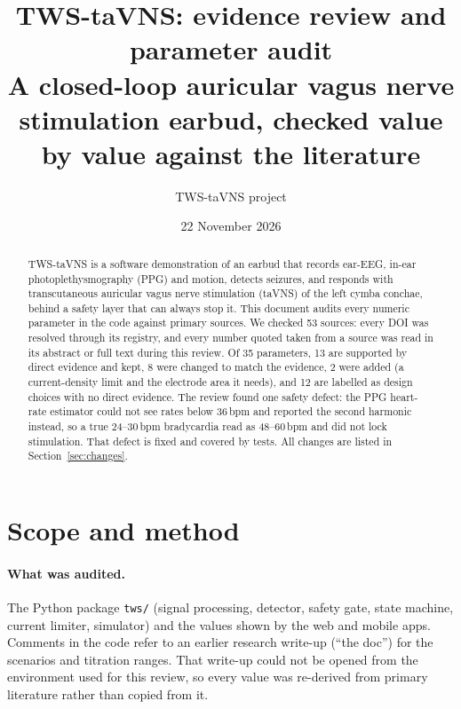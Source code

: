 \documentclass[10pt,a4paper]{article}
\title{TWS-taVNS: evidence review and parameter audit\\[2pt]
\large A closed-loop auricular vagus nerve stimulation earbud, checked value by value against the literature}
\author{TWS-taVNS project}
\date{22 November 2026}
\newcommand{\code}[1]{\texttt{\small #1}}
\begin{document}
\maketitle

\begin{abstract}
\noindent TWS-taVNS is a software demonstration of an earbud that records ear-EEG, in-ear photoplethysmography (PPG) and
motion, detects seizures, and responds with transcutaneous auricular vagus nerve stimulation (taVNS) of the left cymba
conchae, behind a safety layer that can always stop it. This document audits every numeric parameter in the code
against primary sources. We checked 53 sources: every DOI was resolved through its registry, and every number quoted
taken from a source was read in its abstract or full text during this review. Of 35 parameters, 13 are supported by
direct evidence and kept, 8 were changed to match the evidence, 2 were added (a current-density limit and the electrode
area it needs), and 12 are labelled as design choices with no direct evidence. The review found one safety defect: the PPG heart-rate estimator could not see rates below
36\,bpm and reported the second harmonic instead, so a true 24--30\,bpm bradycardia read as 48--60\,bpm and did not lock
stimulation. That defect is fixed and covered by tests. All changes are listed in Section~\ref{sec:changes}.
\end{abstract}

\tableofcontents
\bigskip

\section{Scope and method}\label{sec:method}

\paragraph{What was audited.} The Python package \code{tws/} (signal processing, detector, safety gate, state machine,
current limiter, simulator) and the values shown by the web and mobile apps. Comments in the code refer to an earlier
research write-up (``the doc'') for the scenarios and titration ranges. That write-up could not be opened from the
environment used for this review, so every value was re-derived from primary literature rather than copied from it.
\end{document}
